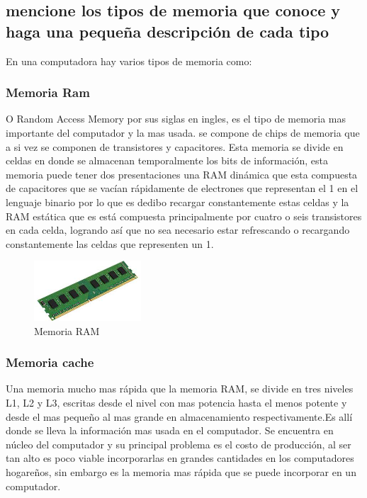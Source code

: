     \subsection{mencione los tipos de memoria que conoce y haga una pequeña descripción de cada tipo}
    En una computadora hay varios tipos de memoria como: 
    
        \subsubsection{Memoria Ram}
        O Random Access Memory por sus siglas en ingles, es el tipo de memoria mas importante del computador y la mas usada. se compone de chips de memoria que a si vez se componen de transistores y capacitores. Esta memoria se divide en celdas en donde se almacenan temporalmente los bits de información, esta memoria puede tener dos presentaciones una RAM dinámica que esta compuesta de capacitores que se vacían rápidamente de electrones que representan el 1 en el lenguaje binario por lo que es dedibo recargar constantemente estas celdas y la RAM estática que es está compuesta principalmente por cuatro o seis transistores en cada celda, logrando así que no sea necesario estar refrescando o recargando constantemente las celdas que representen un 1.
        
        \begin{figure}[h]
        \includegraphics[width=4cm]{ram.jpg}
        \centering
        \caption{Memoria RAM}
        \label{fig:Memoria RAM}
        \end{figure}    
        
        
        \subsubsection{Memoria cache}
        Una memoria mucho mas rápida que la memoria RAM, se divide en tres niveles L1, L2 y L3, escritas desde el nivel con mas potencia hasta el menos potente y desde el mas pequeño al mas grande en almacenamiento respectivamente.Es allí donde se lleva la información mas usada en el computador. Se encuentra en núcleo del computador y su principal problema es el costo de producción, al ser tan alto es poco viable incorporarlas en grandes cantidades en los computadores hogareños, sin embargo es la memoria mas rápida que se puede incorporar en un computador.   
        
